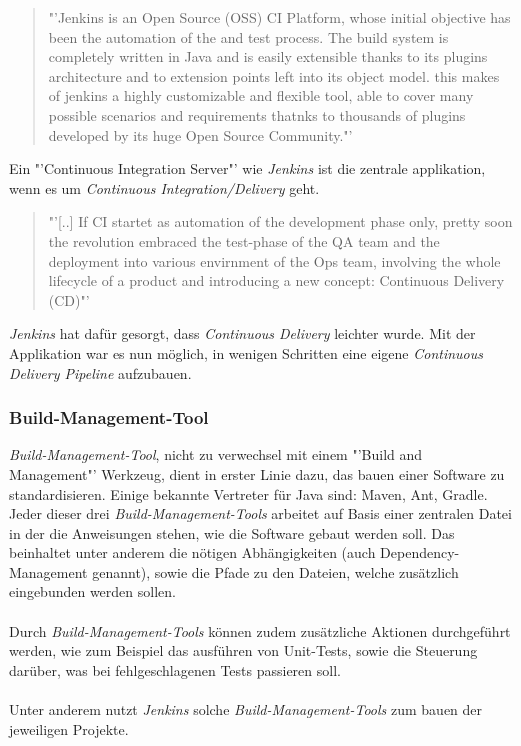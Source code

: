 \begin{quote}
	"'Jenkins is an Open Source (OSS) CI Platform, whose initial objective has been the automation of the  and test process. The build system is completely written in Java and is easily extensible thanks to its plugins architecture and to extension points left into its object model. this makes of jenkins a highly customizable and flexible tool, able to cover many possible scenarios and requirements thatnks to thousands of plugins developed by its huge Open Source Community."'\cite{IEEE:CDMitJenkins}
\end{quote}
Ein "'Continuous Integration Server"'  wie \textit{Jenkins} ist die zentrale applikation, wenn es um \textit{Continuous Integration/Delivery} geht.
\begin{quote}
	"'[..] If CI startet as automation of the development phase only, pretty soon the revolution embraced the test-phase of the QA team and the deployment into various envirnment of the Ops team, involving the whole lifecycle of a product and introducing a new concept: Continuous Delivery (CD)"'\cite{IEEE:CDMitJenkins}
\end{quote}
\textit{Jenkins} hat dafür gesorgt, dass \textit{Continuous Delivery} leichter wurde. Mit der Applikation war es nun möglich, in wenigen Schritten eine eigene \textit{Continuous Delivery Pipeline} aufzubauen.

\subsubsection*{Build-Management-Tool}
\textit{Build-Management-Tool}, nicht zu verwechsel mit einem "'Build and Management"' Werkzeug, dient in erster Linie dazu, das bauen einer Software zu standardisieren. Einige bekannte Vertreter für Java sind: Maven, Ant, Gradle. Jeder dieser drei \textit{Build-Management-Tools} arbeitet auf Basis einer zentralen Datei in der die Anweisungen stehen, wie die Software gebaut werden soll. Das beinhaltet unter anderem die nötigen Abhängigkeiten (auch Dependency-Management genannt), sowie die Pfade zu den Dateien, welche zusätzlich eingebunden werden sollen.
\\\\
Durch \textit{Build-Management-Tools} können zudem zusätzliche Aktionen durchgeführt werden, wie zum Beispiel das ausführen von Unit-Tests, sowie die Steuerung darüber, was bei fehlgeschlagenen Tests passieren soll.
\\\\
Unter anderem nutzt \textit{Jenkins} solche \textit{Build-Management-Tools} zum bauen der jeweiligen Projekte.

